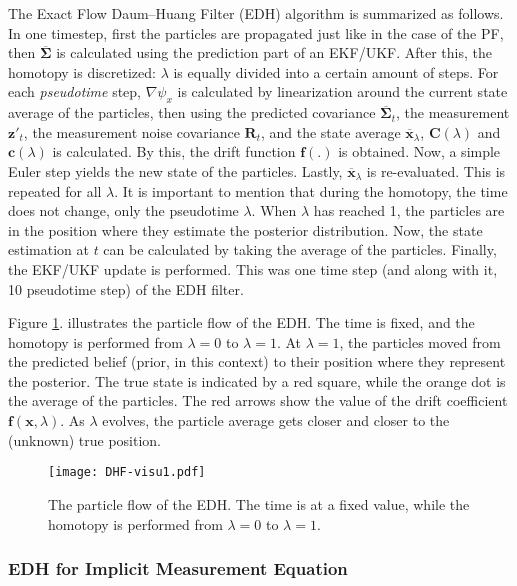 The Exact Flow Daum--Huang Filter (EDH) algorithm is summarized as follows.
In one timestep, first the particles are propagated just like in the case of the PF, then $\overline{\mathbf{\Sigma}}$ is calculated using the prediction part of an EKF/UKF.  After this, the homotopy is discretized: $\lambda$ is equally divided into a certain amount of steps. For each \emph{pseudotime} step, $\nabla \psi_x$ is calculated  by linearization around the current state average of the particles, then using the predicted covariance $\overline{\mathbf{\Sigma}}_t$, the measurement $\mathbf{z}'_t$, the measurement noise covariance $\mathbf{R}_t$, and the state average $\overline{\mathbf{x}}_\lambda$, $\mathbf{C}(\lambda)$ and $\mathbf{c}(\lambda)$ is calculated. By this, the drift function $\mathbf{f}(.)$ is obtained. Now, a simple Euler step yields the new state of the particles. Lastly, $\overline{\mathbf{x}}_\lambda$ is re-evaluated. This is repeated for all $\lambda$. It is important to mention that during the homotopy, the time does not change, only the pseudotime $\lambda$. When $\lambda$ has reached 1, the particles are in the position where they estimate the posterior distribution. Now, the state estimation at $t$ can be calculated by taking the average of the particles. Finally, the EKF/UKF update is performed. This was one time step (and along with it, 10 pseudotime step) of the EDH filter.

Figure \ref{fig:dhf-ill}. illustrates the particle flow of the EDH. The time is fixed, and the homotopy is performed from $\lambda = 0$ to $\lambda = 1$. At $\lambda = 1$, the particles moved from the predicted belief (prior, in this context) to their position where they represent the posterior. The true state is indicated by a red square, while the orange dot is the average of the particles. The red arrows show the value of the drift coefficient $\mathbf{f}(\mathbf{x},\lambda)$. As $\lambda$ evolves, the particle average gets closer and closer to the (unknown) true position.

\begin{figure}
    \centering
    \texttt{[image: DHF-visu1.pdf]}
    \caption{The particle flow of the EDH. The time is at a fixed value, while the homotopy is performed from $\lambda = 0$ to $\lambda = 1$.}
    \label{fig:dhf-ill}
\end{figure}

\subsubsection{EDH for Implicit Measurement Equation}

